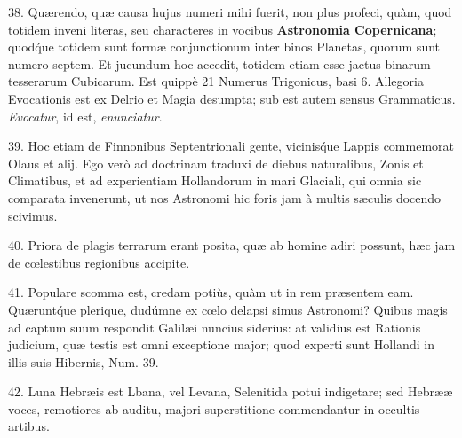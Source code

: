 \documentclass[a4paper, 11pt, oneside, polutonikogreek, german]{article}
\begin{document}
38. Quærendo, quæ causa hujus numeri mihi fuerit, non plus profeci, quàm, quod totidem inveni literas, seu characteres in vocibus \textbf{Astronomia Copernicana}; quod\'que totidem sunt formæ conjunctionum inter binos Planetas, quorum sunt numero septem. Et jucundum hoc accedit, totidem etiam esse jactus binarum tesserarum Cubicarum. Est quippè 21 Numerus Trigonicus, basi 6. Allegoria Evocationis est ex Delrio et Magia desumpta; sub est autem sensus Grammaticus. \emph{Evocatur}, id est, \emph{enunciatur}.

39. Hoc etiam de Finnonibus Septentrionali gente, vicinis\'que Lappis commemorat Olaus et alij. Ego verò ad doctrinam traduxi de diebus naturalibus, Zonis et Climatibus, et ad experientiam Hollandorum in mari Glaciali, qui omnia sic comparata invenerunt, ut nos Astronomi hic foris jam à multis sæculis docendo scivimus.

40. Priora de plagis terrarum erant posita, quæ ab homine adiri possunt, hæc jam de cœlestibus regionibus accipite.

41. Populare scomma est, credam potiùs, quàm ut in rem præsentem eam. Quærunt\'que plerique, dudúmne ex cœlo delapsi simus Astronomi? Quibus magis ad captum suum respondit Galilæi nuncius siderius: at validius est Rationis judicium, quæ testis est omni exceptione major; quod experti sunt Hollandi in illis suis Hibernis, Num. 39.

42. Luna Hebræis est Lbana, vel Levana, Selenitida potui indigetare; sed Hebrææ voces, remotiores ab auditu, majori superstitione commendantur in occultis artibus.
\end{document}
